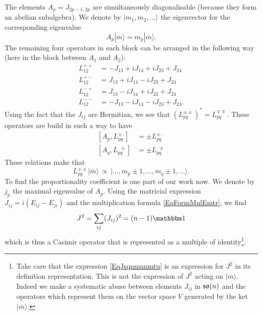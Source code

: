 The elements $A_p=J_{2p-1,2p}$ are simultaneously diagonalisable (because they form an abelian subalgebra). We denote by $| m_1,m_2,\ldots \rangle$ the eigenvector for the corresponding eigenvalue
\begin{equation}
	A_p| \overline{ m } \rangle=m_p| \overline{ m } \rangle.
\end{equation}
The remaining four operators in each block can be arranged in the following way (here in the block between $A_1$ and $A_2$):
\begin{subequations}		\label{subEqLppmmettouteca}
	\begin{align}
		L_{12}^{++}&=-J_{13}+iJ_{14}+iJ_{23}+J_{24}\\
		L_{12}^{+-}&=J_{13}+iJ_{14}-iJ_{23}+J_{24}\\
		L_{12}^{-+}&=J_{13}-iJ_{14}+iJ_{23}+J_{24}\\
		L_{12}^{--}&=-J_{13}-iJ_{14}-iJ_{23}+J_{24}.
	\end{align}
\end{subequations}
Using the fact that the $J_{ij}$ are Hermitian, we see that $(L_{pq}^{\pm\pm})^*=L_{pq}^{\mp\mp}$. These operators are build in such a way to have
\begin{subequations}		\label{SubEqCommsLppmmettoutca}
	\begin{align}
		[A_p,L_{pq}^{\pm\,.}]&=\pm L_{pq}^{\pm\,.}\\
		[A_q,L_{pq}^{.\,\pm}]&=\pm L_{pq}^{.\,\pm}
	\end{align}
\end{subequations}
These relations make that 
\begin{equation}
	L_{pq}^{\pm\pm}| \overline{ m } \rangle\,\propto\, | \ldots,m_p\pm 1,\ldots,m_q\pm 1,\ldots \rangle.
\end{equation}
To find the proportionality coefficient is one part of our work now. We denote by $j_p$ the maximal eigenvalue of $A_p$. Using the matricial expression $J_{ij}=i(E_{ij}-E_{ji})$ and the multiplication formula \eqref{EqFormMulEmtr}, we find
\begin{equation}			\label{EqJsqnmunmtu}
	J^2=\sum_{ij}(J_{ij})^2=(n-1)\mtu
\end{equation}
which is thus a Casimir operator that is represented as a multiple of identity\footnote{Take care that the expression \eqref{EqJsqnmunmtu} is an expression for $J^2$ in its definition representation. This is not the expression of $J^2$ acting on $| \overline{ m } \rangle$. Indeed we make a systematic abuse between elements $J_{ij}$ in $\operatorname{\mathfrak{so}}(n)$ and the operators which represent them on the vector space $V$ generated by the ket $| \overline{ m } \rangle$.}.

